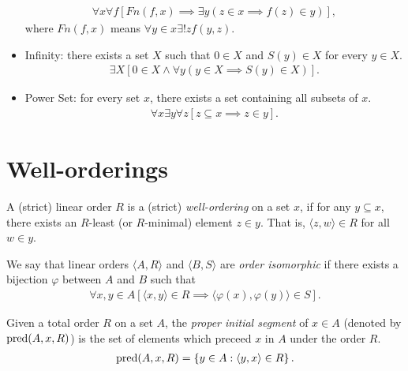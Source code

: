 \begin{itemize}
    \begin{align*}
        \forall x\forall f\left[Fn(f, x) \implies \exists y\left(z \in x \implies f(z) \in y\right)\right],
    \end{align*}
    where $Fn(f, x)$ means $\forall y \in x \exists !z f(y, z)$.
    \item Infinity: there exists a set $X$ such that $0 \in X$ and $S(y) \in X$ for every $y \in X$.
    \begin{align*}
        \exists X\left[0 \in X \land \forall y\left(y \in X \implies S(y) \in X\right)\right].
    \end{align*}
    \item Power Set: for every set $x$, there exists a set containing all subsets of $x$.
    \begin{align*}
        \forall x\exists y\forall z\left[z \subseteq x \implies z \in y\right].
    \end{align*}
\end{itemize}

\section{Well-orderings}

\begin{defn}
    A (strict) linear order $R$ is a (strict) \emph{well-ordering} on a set $x$, if for any $y \subseteq x$, there exists an $R$-least (or $R$-minimal) element $z \in y$. That is, $\langle z, w\rangle \in R$ for all $w \in y$.
\end{defn}

\begin{defn}
    We say that linear orders $\langle A, R\rangle$ and $\langle B, S \rangle$ are \emph{order isomorphic} if there exists a bijection $\varphi$ between $A$ and $B$ such that
    \begin{align*}
        \forall x, y \in A\left[\langle x, y \rangle \in R \implies \langle \varphi(x), \varphi(y)\rangle \in S\right].
    \end{align*}
\end{defn}

\begin{defn}
    Given a total order $R$ on a set $A$, the \emph{proper initial segment} of $x \in A$ (denoted by $\operatorname{pred}(A, x, R)$) is the set of elements which preceed $x$ in $A$ under the order $R$.
    \begin{align*}
        \operatorname{pred}(A, x, R) = \left\{y \in A : \langle y, x \rangle \in R\right\}.
    \end{align*}
\end{defn}

